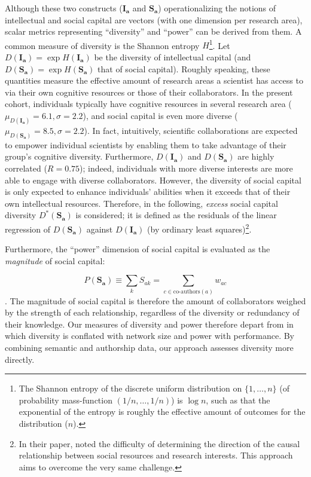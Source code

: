\documentclass{article}
\begin{document}
Although these two constructs ($\bm{I_a}$ and $\bm{S_a}$) operationalizing the notions of intellectual and social capital are vectors (with one dimension per research area), scalar metrics representing ``diversity'' and ``power'' can be derived from them. A common measure of diversity is the Shannon entropy $H$\footnote{The Shannon entropy of the discrete uniform distribution on $\{1,\dots,n\}$ (of probability mass-function $(1/n,\dots,1/n)$) is $\log{n}$, such as that the exponential of the entropy is roughly the effective amount of outcomes for the distribution ($n$).}. Let 
 $D(\bm{I_a})=\exp{H(\bm{I_a})}$ be the diversity of intellectual capital (and $D(\bm{S_a})=\exp{H(\bm{S_a})}$ that of social capital). Roughly speaking, these quantities measure the effective amount of research areas a scientist has access to via their own cognitive resources or those of their collaborators. In the present cohort,  individuals typically have cognitive resources in several research area ($\mu_{D(\bm{I_a})}=6.1,\sigma=2.2$), and social capital is even more diverse ($\mu_{D(\bm{S_a})}=8.5,\sigma=2.2$). In fact, intuitively,  scientific collaborations are expected to empower individual scientists by enabling them to take advantage of their group's cognitive diversity. Furthermore, $D(\bm{I_a})$ and $D(\bm{S_a})$ are highly correlated ($R=0.75$); indeed, individuals with more diverse interests are more able to engage with diverse collaborators. However, the diversity of social capital is only expected to enhance individuals' abilities when it exceeds that of their own intellectual resources. Therefore, in the following, \textit{excess} social capital diversity $D^{\ast}(\bm{S_a})$ is considered; it is defined as the residuals of the linear regression of $D(\bm{S_a})$ against $D(\bm{I_a})$ (by ordinary least squares)\footnote{In their paper, \citet{Tripodi2020} noted the difficulty of determining the direction of the causal relationship between social resources and research interests. This approach aims to overcome the very same challenge.}.

Furthermore, the ``power'' dimension of social capital is evaluated as the \textit{magnitude} of social capital:

\begin{equation}
    P(\bm{S_a})\equiv \sum_k S_{ak} = \sum_{c \in \text{co-authors}(a)} w_{ac}
\end{equation}. The magnitude of social capital is therefore the amount of collaborators weighed by the strength of each relationship, regardless of the diversity or redundancy of their knowledge. Our measures of diversity and power therefore depart from \citealt{Abbasi2014} in which diversity is conflated with network size and power with performance. By combining semantic and authorship data, our approach assesses diversity more directly. %
\end{document}
